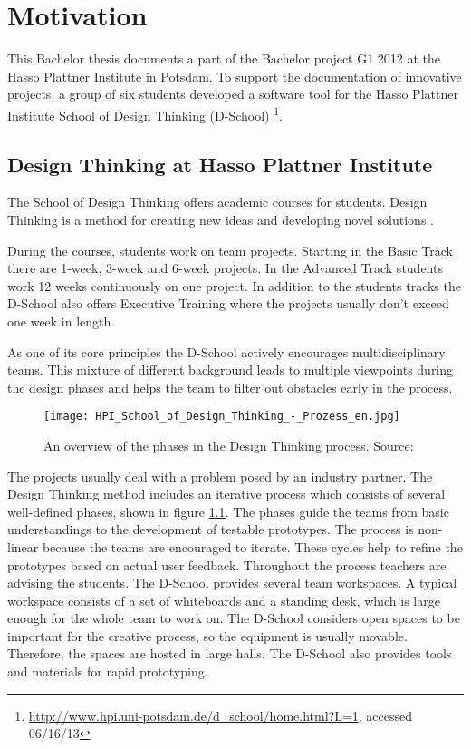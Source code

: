 \chapter{Motivation}

This Bachelor thesis documents a part of the Bachelor project G1 2012 at the Hasso Plattner Institute in Potsdam. To support the documentation of innovative projects, a group of six students developed a software tool for the Hasso Plattner Institute School of Design Thinking (D-School) \footnote{\url{http://www.hpi.uni-potsdam.de/d_school/home.html?L=1}, accessed 06/16/13}. 

\section{Design Thinking at Hasso Plattner Institute}
The School of Design Thinking offers academic courses for students. Design Thinking is a method for creating new ideas and developing novel solutions \cite{Plattner_2009}. 

During the courses, students work on team projects. Starting in the Basic Track there are 1-week, 3-week and 6-week projects. In the Advanced Track students work 12 weeks continuously on one project. In addition to the students tracks the D-School also offers Executive Training where the projects usually don't exceed one week in length. 

As one of its core principles the D-School actively encourages multidisciplinary teams. This mixture of different background leads to multiple viewpoints during the design phases and helps the team to filter out obstacles early in the process. 

\begin{figure}[!h]
\texttt{[image: HPI\_School\_of\_Design\_Thinking\_-\_Prozess\_en.jpg]}
\caption{An overview of the phases in the Design Thinking process. Source: \cite{Plattner_2009}}
\label{fig:DT_phases}
\end{figure}

The projects usually deal with a problem posed by an industry partner. The Design Thinking method includes an iterative process which consists of several well-defined phases, shown in figure \ref{fig:DT_phases}. The phases guide the teams from basic understandings to the development of testable prototypes. The process is non-linear because the teams are encouraged to iterate. These cycles help to refine the prototypes based on actual user feedback. Throughout the process teachers are advising the students.
The D-School provides several team workspaces. A typical workspace consists of a set of whiteboards and a standing desk, which is large enough for the whole team to work on. The D-School considers open spaces to be important for the creative process, so the equipment is usually movable. Therefore, the spaces are hosted in large halls. The D-School also provides tools and materials for rapid prototyping.

